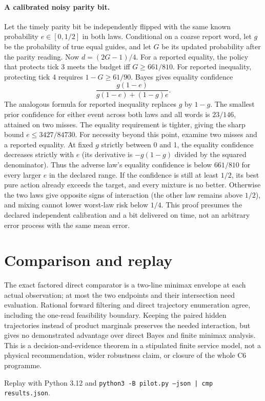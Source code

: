 \documentclass[11pt]{article}
\begin{document}
\paragraph{A calibrated noisy parity bit.}
Let the timely parity bit be independently flipped with the same known probability $e\in[0,1/2]$ in both laws. Conditional on a coarse report word, let $g$ be the probability of true equal guides, and let $G$ be its updated probability after the parity reading. Now $d=(2G-1)/4$. For a reported equality, the policy that protects tick 3 meets the budget iff $G\ge661/810$. For reported inequality, protecting tick 4 requires $1-G\ge61/90$. Bayes gives equality confidence
\[
\frac{g(1-e)}{g(1-e)+(1-g)e}.
\]
The analogous formula for reported inequality replaces $g$ by $1-g$. The smallest prior confidence for either event across both laws and all words is $23/146$, attained on two misses. The equality requirement is tighter, giving the sharp bound $e\le3427/84730$. For necessity beyond this point, examine two misses and a reported equality. At fixed $g$ strictly between 0 and 1, the equality confidence decreases strictly with $e$ (its derivative is $-g(1-g)$ divided by the squared denominator). Thus the adverse law's equality confidence is below $661/810$ for every larger $e$ in the declared range. If the confidence is still at least $1/2$, its best pure action already exceeds the target, and every mixture is no better. Otherwise the two laws give opposite signs of interaction (the other law remains above $1/2$), and mixing cannot lower worst-law risk below $1/4$. This proof presumes the declared independent calibration and a bit delivered on time, not an arbitrary error process with the same mean error.

\section{Comparison and replay}
The exact factored direct comparator is a two-line minimax envelope at each actual observation; at most the two endpoints and their intersection need evaluation. Rational forward filtering and direct trajectory enumeration agree, including the one-read feasibility boundary. Keeping the paired hidden trajectories instead of product marginals preserves the needed interaction, but gives no demonstrated advantage over direct Bayes and finite minimax analysis. This is a decision-and-evidence theorem in a stipulated finite service model, not a physical recommendation, wider robustness claim, or closure of the whole C6 programme.

Replay with Python 3.12 and \texttt{python3 -B pilot.py --json | cmp results.json}.
\end{document}

